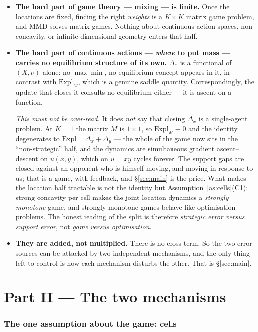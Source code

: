 \documentclass[11pt,a4paper]{article}
\theoremstyle{plain}
\theoremstyle{definition}
\theoremstyle{remark}
\newcommand{\Expl}{\mathrm{Expl}}
\begin{document}
\begin{itemize}[leftmargin=*]
\item \textbf{The hard part of game theory --- mixing --- is finite.} Once the
locations are fixed, finding the right \emph{weights} is a $K\times K$ matrix game
problem, and MMD solves matrix games. Nothing about continuous action spaces,
non-concavity, or infinite-dimensional geometry enters that half.
\item \textbf{The hard part of continuous actions --- \emph{where} to put mass ---
carries no equilibrium structure of its own.} $\Delta_x$ is a functional of $(X,\nu)$
alone: no $\max\min$, no equilibrium concept appears in it, in contrast with $\Expl_M$,
which is a genuine saddle quantity. Correspondingly, the update that closes it
consults no equilibrium either --- it is ascent on a function.

\emph{This must not be over-read.} It does \emph{not} say that closing $\Delta_x$ is a
single-agent problem. At $K=1$ the matrix $M$ is $1\times1$, so $\Expl_M\equiv0$ and the
identity degenerates to $\Expl=\Delta_x+\Delta_y$ --- the whole of the game now sits in
the ``non-strategic'' half, and the dynamics are simultaneous gradient
ascent--descent on $u(x,y)$, which on $u=xy$ cycles forever. The support gaps are closed
against an opponent who is himself moving, and moving in response to us; that is a game,
with feedback, and \S\ref{sec:main} is the price. What makes the location half tractable
is not the identity but Assumption~\ref{as:cells}(C1): strong concavity per cell makes
the joint location dynamics a \emph{strongly monotone} game, and strongly monotone games
behave like optimisation problems. The honest reading of the split is therefore
\emph{strategic error versus support error}, not \emph{game versus optimisation}.
\item \textbf{They are added, not multiplied.} There is no cross term. So the two
error sources can be attacked by two independent mechanisms, and the only thing
left to control is how each mechanism disturbs the other. That is \S\ref{sec:main}.
\end{itemize}

\newpage
\part*{Part II --- The two mechanisms}

\section{The one assumption about the game: cells}\label{sec:cells}
\end{document}
